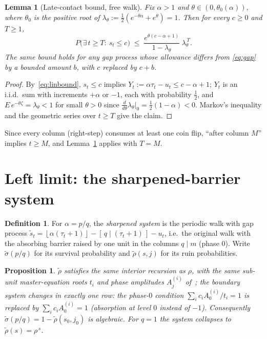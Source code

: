 \documentclass[11pt]{article}
\newtheorem{lemma}[theorem]{Lemma}
\newtheorem{proposition}[theorem]{Proposition}
\theoremstyle{definition}
\newtheorem{definition}[theorem]{Definition}
\theoremstyle{remark}
\newcommand{\floor}[1]{\left\lfloor #1 \right\rfloor}
\begin{document}
\begin{lemma}[Late-contact bound, free walk]\label{lem:chernoff}
Fix $\alpha > 1$ and $\theta \in (0, \theta_0(\alpha))$, where
$\theta_0$ is the positive root of
$\lambda_\theta := \tfrac12(e^{-\theta\alpha} + e^{\theta}) = 1$.
Then for every $c \geq 0$ and $T \geq 1$,
\[
P\bigl(\exists\, t \geq T:\ s_t \leq c\bigr)
\;\leq\; \frac{e^{\theta(c - \alpha + 1)}}{1 - \lambda_\theta}\;
\lambda_\theta^{\,T}.
\]
The same bound holds for any gap process whose allowance differs from
\eqref{eq:gap} by a bounded amount $b$, with $c$ replaced by $c + b$.
\end{lemma}

\begin{proof}
By~\eqref{eq:linbound}, $s_t \leq c$ implies
$Y_t := \alpha\tau_t - u_t \leq c - \alpha + 1$; $Y_t$ is an i.i.d.\
sum with increments $+\alpha$ or $-1$, each with probability
$\tfrac12$, and $E\,e^{-\theta\zeta} = \lambda_\theta < 1$ for small
$\theta > 0$ since
$\frac{d}{d\theta}\lambda_\theta|_{0} = \tfrac12(1 - \alpha) < 0$.
Markov's inequality and the geometric series over $t \geq T$ give the
claim.
\end{proof}

Since every column (right-step) consumes at least one coin flip,
``after column $M$'' implies $t \geq M$, and
Lemma~\ref{lem:chernoff} applies with $T = M$.

\section{Left limit: the sharpened-barrier system}

\begin{definition}\label{def:sharp}
For $\alpha = p/q$, the \emph{sharpened system} is the periodic walk
with gap process
$\tilde s_t = \floor{\alpha(\tau_t+1)} - [\,q \mid (\tau_t+1)\,] - u_t$,
i.e.\ the original walk with the absorbing barrier raised by one unit
in the columns $q \mid m$ (phase $0$).
Write $\tilde\sigma(p/q)$ for its survival probability and
$\tilde\rho(s, j)$ for its ruin probabilities.
\end{definition}

\begin{proposition}\label{prop:sharp-solve}
$\tilde\rho$ satisfies the same interior recursion as $\rho$, with the
same sub-unit master-equation roots $t_i$ and phase amplitudes
$A_j^{(i)}$ of~\cite{bridge}; the boundary system changes in exactly
one row: the phase-$0$ condition $\sum_i c_i A_0^{(i)}/t_i = 1$ is
replaced by $\sum_i c_i A_0^{(i)} = 1$ (absorption at level $0$
instead of $-1$).
Consequently $\tilde\sigma(p/q) = 1 - \tilde\rho(s_0, j_0)$ is
algebraic.
For $q = 1$ the system collapses to $\tilde\rho(s) = \rho^{\,s}$.
\end{proposition}
\end{document}
